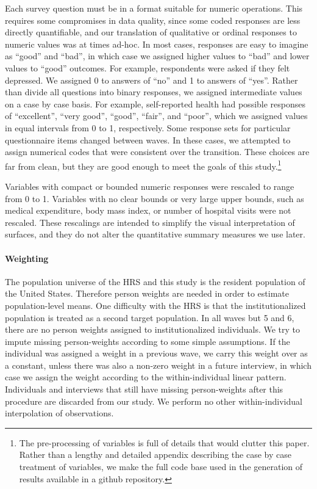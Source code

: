 \documentclass{article}
\begin{document}
Each survey question must be in a format suitable for numeric operations.
This requires some compromises in data quality, since some coded responses are less directly
quantifiable, and our translation of qualitative or ordinal responses to numeric
values was at times ad-hoc. In most cases, responses are easy to imagine as
``good'' and ``bad'', in which case we assigned higher values to ``bad'' and
lower values to ``good'' outcomes. For example, respondents were asked if they
felt depressed. We assigned 0 to answers of ``no'' and 1 to answers of ``yes''.
Rather than divide all questions into binary responses, we assigned intermediate
values on a case by case basis. For example, self-reported health
had possible responses of ``excellent'', ``very good'', ``good'',
``fair'', and ``poor'', which we assigned values in equal intervals
from 0 to 1, respectively. Some response
sets for particular questionnaire items changed between
waves.
In these cases, we attempted to assign numerical codes that were consistent
over the transition. These choices are far from clean, but they are good enough
to meet the goals of this study.\footnote{The pre-processing of variables is
full of details that would clutter this paper. Rather than a lengthy and detailed appendix describing the case by case treatment of variables, we make the full code base used in the generation of results available in a github repository.}

Variables with compact or bounded numeric responses were rescaled to range from
0 to 1. Variables with no clear bounds or very large upper
bounds, such as medical expenditure, body mass index, or number of hospital
visits were not rescaled. These rescalings are intended to simplify
the visual interpretation of surfaces, and they do not alter the
quantitative summary measures we use later.

\paragraph*{Weighting}
The population universe of the HRS and this study is the resident
population of the United States. Therefore person weights are needed in
order to estimate population-level means. 
One difficulty with the HRS is that the institutionalized population is treated
as a second target population. In all waves but 5 and 6, there are no person weights
assigned to institutionalized individuals. We try to impute missing
person-weights according to some simple assumptions. If the individual was
assigned a weight in a previous wave, we carry this weight over as a constant, unless there was also a non-zero weight in a future interview, in
which case we assign the weight according to the within-individual linear
pattern. Individuals and interviews that still have missing person-weights
after this procedure are discarded from our study. We perform no other
within-individual interpolation of observations.
\end{document}
